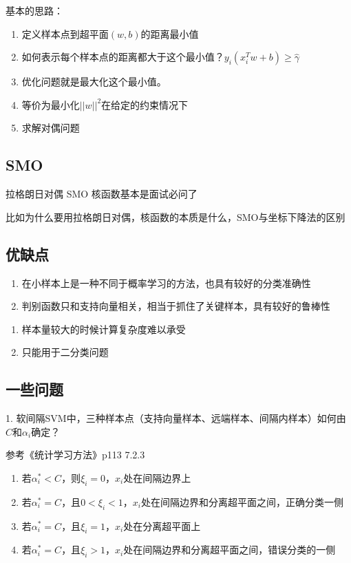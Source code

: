 基本的思路：
\begin{enumerate}
\item 定义样本点到超平面$(w,b)$的距离最小值
\item 如何表示每个样本点的距离都大于这个最小值？$y_i(x_i^T w + b) \ge \hat{\gamma}$
\item 优化问题就是最大化这个最小值。
\item 等价为最小化$||w||^2$在给定的约束情况下
\item 求解对偶问题
\end{enumerate}

\subsection{SMO}
拉格朗日对偶
SMO
核函数基本是面试必问了

比如为什么要用拉格朗日对偶，核函数的本质是什么，SMO与坐标下降法的区别

\subsection{优缺点}
{}
\begin{enumerate}
\item 在小样本上是一种不同于概率学习的方法，也具有较好的分类准确性
\item 判别函数只和支持向量相关，相当于抓住了关键样本，具有较好的鲁棒性
\end{enumerate}

{}
\begin{enumerate}
\item 样本量较大的时候计算复杂度难以承受
\item 只能用于二分类问题
\end{enumerate}

\subsection{一些问题}
1. 软间隔SVM中，三种样本点（支持向量样本、远端样本、间隔内样本）如何由$C$和$\alpha_i$确定？

参考《统计学习方法》p113 7.2.3
\begin{enumerate}
\item 若$\alpha_i^* < C$，则$\xi_i = 0$，$x_i$处在间隔边界上
\item 若$\alpha_i^* = C$，且$0 < \xi_i < 1$，$x_i$处在间隔边界和分离超平面之间，正确分类一侧
\item 若$\alpha_i^* = C$，且$\xi_i = 1$，$x_i$处在分离超平面上
\item 若$\alpha_i^* = C$，且$\xi_i > 1$，$x_i$处在间隔边界和分离超平面之间，错误分类的一侧
\end{enumerate}





